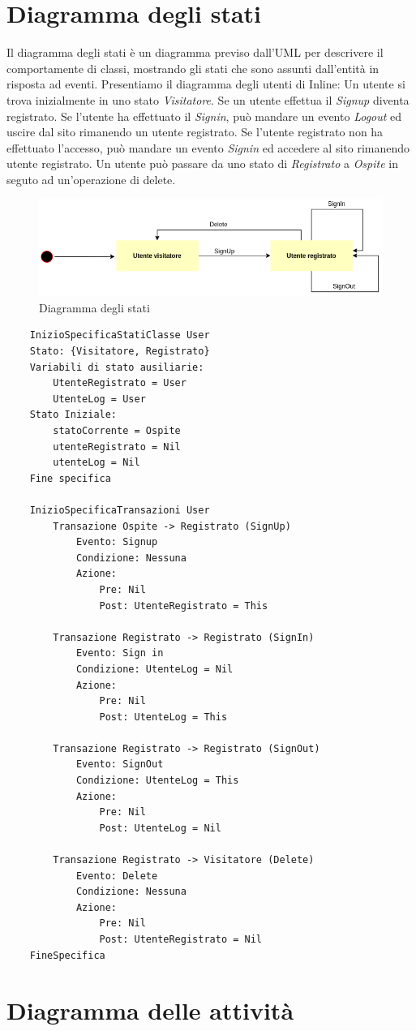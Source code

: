 \section{Diagramma degli stati}
Il diagramma degli stati è un diagramma previso dall'UML per descrivere il comportamente di classi, mostrando gli stati che sono assunti dall'entità in risposta ad eventi.
Presentiamo il diagramma degli utenti di Inline: Un utente si trova inizialmente in uno stato \textit{Visitatore}. Se un utente effettua il \textit{Signup} diventa registrato. Se l'utente ha effettuato il \textit{Signin}, può mandare un evento \textit{Logout} ed uscire dal sito rimanendo un utente registrato. Se l'utente registrato non ha effettuato l'accesso, può mandare un evento \textit{Signin} ed accedere al sito rimanendo utente registrato. Un utente può passare da uno stato di \textit{Registrato} a \textit{Ospite} in seguto ad un'operazione di delete.

\begin{figure}[H]
	\centering
	\includegraphics[width=\textwidth]{./media/DiagrammaStati.png}
	\caption{Diagramma degli stati}
\end{figure}

\begin{lstlisting}
	InizioSpecificaStatiClasse User
	Stato: {Visitatore, Registrato}
	Variabili di stato ausiliarie:
		UtenteRegistrato = User
		UtenteLog = User
	Stato Iniziale:
		statoCorrente = Ospite
		utenteRegistrato = Nil
		utenteLog = Nil
	Fine specifica

	InizioSpecificaTransazioni User
		Transazione Ospite -> Registrato (SignUp)
			Evento: Signup
			Condizione: Nessuna
			Azione: 
				Pre: Nil
				Post: UtenteRegistrato = This
		
		Transazione Registrato -> Registrato (SignIn)
			Evento: Sign in
			Condizione: UtenteLog = Nil
			Azione:
				Pre: Nil
				Post: UtenteLog = This
		
		Transazione Registrato -> Registrato (SignOut)
			Evento: SignOut
			Condizione: UtenteLog = This
			Azione:
				Pre: Nil
				Post: UtenteLog = Nil
		
		Transazione Registrato -> Visitatore (Delete)
			Evento: Delete
			Condizione: Nessuna
			Azione:
				Pre: Nil
				Post: UtenteRegistrato = Nil
	FineSpecifica	
\end{lstlisting}

\section{Diagramma delle attività}
